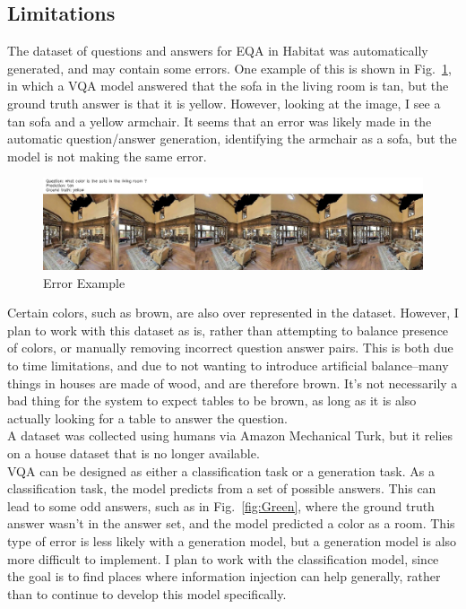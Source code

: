 \documentclass{article}
\begin{document}
\subsection{Limitations}
The dataset of questions and answers for EQA in Habitat was automatically generated, and may contain some errors. One example of this is shown in Fig.~\ref{fig:err_ex}, in which a VQA model answered that the sofa in the living room is tan, but the ground truth answer is that it is yellow. However, looking at the image, I see a tan sofa and a yellow armchair. It seems that an error was likely made in the automatic question/answer generation, identifying the armchair as a sofa, but the model is not making the same error. \\
\begin{figure}[h]
	\centering
	\includegraphics[width=\textwidth]{../error_images/ckpt_0_121_image.jpg}
	\caption{Error Example}
	\label{fig:err_ex}
\end{figure}
Certain colors, such as brown, are also over represented in the dataset. However, I plan to work with this dataset as is, rather than attempting to balance presence of colors, or manually removing incorrect question answer pairs. This is both due to time limitations, and due to not wanting to introduce artificial balance--many things in houses are made of wood, and are therefore brown. It's not necessarily a bad thing for the system to expect tables to be brown, as long as it is also actually looking for a table to answer the question. \\
A dataset was collected using humans via Amazon Mechanical Turk, but it relies on a house dataset that is no longer available. \\
VQA can be designed as either a classification task or a generation task. As a classification task, the model predicts from a set of possible answers. This can lead to some odd answers, such as in Fig.~\ref{fig:Green}, where the ground truth answer wasn't in the answer set, and the model predicted a color as a room. This type of error is less likely with a generation model, but a generation model is also more difficult to implement. I plan to work with the classification model, since the goal is to find places where information injection can help generally, rather than to continue to develop this model specifically. \\
\end{document}
